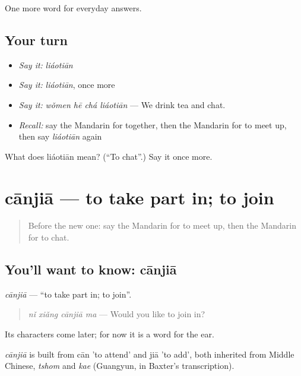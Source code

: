 \begin{grammarlens}[title={What you've built}]
One more word for everyday answers.
\end{grammarlens}

\subsection*{Your turn}
\begin{itemize}
\raggedright
  \item \emph{Say it:} \emph{liáotiān}
  \item \emph{Say it:} \emph{liáotiān}, once more
  \item \emph{Say it:} \emph{wǒmen hē chá liáotiān} — We drink tea and chat.
  \item \emph{Recall:} say the Mandarin for together, then the Mandarin for to meet up, then say \emph{liáotiān} again
\end{itemize}

\begin{tcolorbox}[breakable,colback=teal!4,colframe=teal!35!black,title={Before you move on}]
What does liáotiān mean? (\textquotedblleft{}To chat\textquotedblright{}.) Say it once more.
\end{tcolorbox}
\section[cānjiā]{cānjiā — to take part in; to join}

\label{lesson:ZH-C84-canjia}



\begin{quote}
Before the new one: say the Mandarin for to meet up, then the Mandarin for to chat.
\end{quote}

\subsection*{You'll want to know: cānjiā}
\emph{cānjiā} — \textquotedblleft{}to take part in; to join\textquotedblright{}.

\begin{quote}
\emph{nǐ xiǎng cānjiā ma} — Would you like to join in?
\end{quote}

Its characters come later; for now it is a word for the ear.

\begin{cousinweb}
\emph{cānjiā} is built from cān 'to attend' and jiā 'to add', both inherited from Middle Chinese, \emph{tshom} and \emph{kae} (Guangyun, in Baxter's transcription).
\end{cousinweb}

